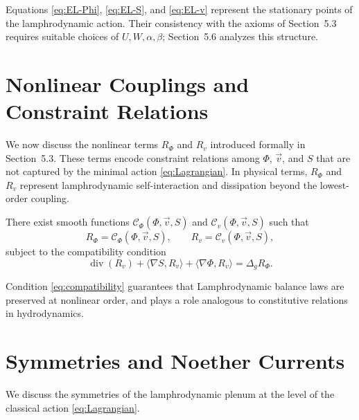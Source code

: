 \begin{remark}
Equations \eqref{eq:EL-Phi}, \eqref{eq:EL-S}, and \eqref{eq:EL-v}
represent the stationary points of the lamphrodynamic action.
Their consistency with the axioms of Section~5.3 requires suitable
choices of $U,W,\alpha,\beta$; Section~5.6 analyzes this structure.
\end{remark}


\section{Nonlinear Couplings and Constraint Relations}
\label{sec:couplings}

We now discuss the nonlinear terms $R_{\Phi}$ and $R_{v}$ introduced
formally in Section~5.3. These terms encode constraint relations among
$\Phi$, $\vec v$, and $S$ that are not captured by the minimal action
\eqref{eq:Lagrangian}. In physical terms, $R_{\Phi}$ and $R_{v}$
represent lamphrodynamic self-interaction and dissipation beyond the
lowest-order coupling.

\begin{axiom}
There exist smooth functions $\mathcal{C}_\Phi(\Phi,\vec v,S)$ and
$\mathcal{C}_v(\Phi,\vec v,S)$ such that
\begin{equation}
\label{eq:R-Phi}
R_{\Phi} = \mathcal{C}_\Phi(\Phi,\vec v,S),\qquad
R_{v} = \mathcal{C}_{v}(\Phi,\vec v,S),
\end{equation}
subject to the compatibility condition
\begin{equation}
\label{eq:compatibility}
\operatorname{div}(R_{v})
+ \langle\nabla S,R_{v}\rangle
+ \langle\nabla\Phi,R_{v}\rangle
= \Delta_g R_{\Phi}.
\end{equation}
\end{axiom}

\begin{remark}
Condition \eqref{eq:compatibility} guarantees that
Lamphrodynamic balance laws are preserved at nonlinear order,
and plays a role analogous to constitutive relations in hydrodynamics.
\end{remark}


\section{Symmetries and Noether Currents}
\label{sec:symmetry-noether}

We discuss the symmetries of the lamphrodynamic plenum at the level
of the classical action \eqref{eq:Lagrangian}.

